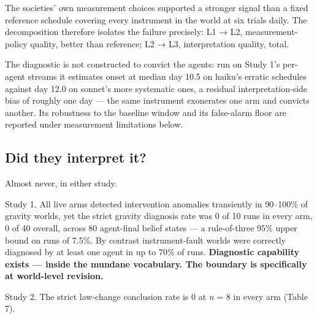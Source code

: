 \documentclass[pdflatex,sn-basic]{sn-jnl}
\begin{document}
The societies' own measurement choices supported a stronger signal than a fixed reference
schedule covering every instrument in the world at six trials daily. The decomposition
therefore isolates the failure precisely: L1 → L2, measurement-policy quality, better than
reference; L2 → L3, interpretation quality, total.

The diagnostic is not constructed to convict the agents: run on Study 1's per-agent streams
it estimates onset at median day 10.5 on haiku's erratic schedules against day 12.0 on
sonnet's more systematic ones, a residual interpretation-side bias of roughly one day --- the
same instrument exonerates one arm and convicts another. Its robustness to the
baseline window and its false-alarm floor are reported under measurement limitations
below.

\hypertarget{did-they-interpret-it}{%
\subsection{Did they interpret it?}\label{did-they-interpret-it}}

Almost never, in either study.

Study 1. All live arms detected intervention anomalies transiently in 90--100\% of
gravity worlds, yet the strict gravity diagnosis rate was 0 of 10 runs in every arm, 0 of
40 overall, across 80 agent-final belief states --- a rule-of-three 95\% upper bound on runs
of 7.5\%. By contrast instrument-fault worlds were correctly diagnosed by at least one
agent in up to 70\% of runs. \textbf{Diagnostic capability exists --- inside the mundane
vocabulary. The boundary is specifically at world-level revision.}

Study 2. The strict law-change conclusion rate is 0 at \emph{n} = 8 in every arm (Table 7).
\end{document}
